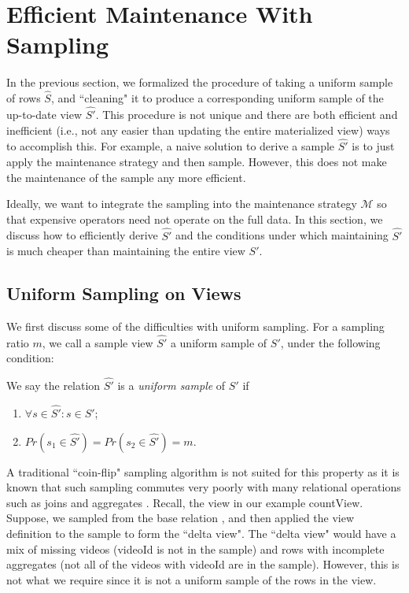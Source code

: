 \section{Efficient Maintenance With Sampling} \label{sampling}
In the previous section, we formalized the procedure of taking a uniform sample of rows $\hat{S}$, and ``cleaning" it to produce a corresponding uniform sample of the up-to-date view $\hat{S'}$.
This procedure is not unique and there are both efficient and inefficient (i.e., not any easier than updating the entire materialized view) ways to accomplish this. 
For example, a naive solution to derive a sample $\hat{S'}$ is to just apply the maintenance strategy and then sample.
However, this does not make the maintenance of the sample any more efficient.

Ideally, we want to integrate the sampling into the maintenance strategy $\mathcal{M}$ so that expensive operators
need not operate on the full data.
In this section, we discuss how to efficiently derive $\hat{S'}$ and the conditions under which
maintaining $\hat{S'}$ is much cheaper than maintaining the entire view $S'$.

\subsection{Uniform Sampling on Views}
We first discuss some of the difficulties with uniform sampling.
For a sampling ratio $m$, we call a sample view $\hat{S'}$ a uniform sample of $S'$, under the following condition:

\begin{definition} We say the relation $\hat{S'}$ is a \emph{uniform sample} of $S'$ if
\begin{enumerate}[label=(\arabic*),itemsep=1pt]
\item $\forall s \in \hat{S'} : s \in S'$;
\item $Pr(s_1 \in \hat{S'}) =  Pr(s_2 \in \hat{S'}) = m$.
\end{enumerate}
\end{definition}

A traditional ``coin-flip" sampling algorithm is not suited for this property as it is known that such sampling commutes very poorly with many relational operations such as joins and aggregates \cite{chaudhuri1999random}.
Recall, the view in our example \textsf{countView}. 
Suppose, we sampled from the base relation , and then applied the view definition to the sample to form the ``delta view".
The ``delta view" would have a mix of missing videos (\textsf{videoId} is not in the sample) and rows with incomplete aggregates (not all of the videos with \textsf{videoId} are in the sample).
However, this is not what we require since it is not a uniform sample of the rows in the view. 


